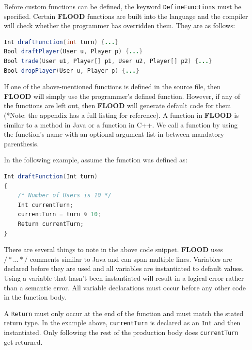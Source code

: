 \documentclass[12pt]{report}
\begin{document}
Before custom functions can be defined, the keyword \texttt{DefineFunctions} must be specified. Certain \textbf{FLOOD} functions are built into the language and the compiler will check whether the programmer has overridden them. They are as follows:

\begin{singlespace}
\begin{lstlisting}[language=Java,label=some-code,caption={Predefined FLOOD functions.}]
Int draftFunction(int turn) {...}
Bool draftPlayer(User u, Player p) {...}
Bool trade(User u1, Player[] p1, User u2, Player[] p2) {...}
Bool dropPlayer(User u, Player p) {...}
\end{lstlisting}
\end{singlespace}

If one of the above-mentioned functions is defined in the source file, then \textbf{FLOOD} will simply use the programmer's defined function. However, if any of the functions are left out, then \textbf{FLOOD} will generate default code for them (*Note: the appendix has a full listing for reference). A function in \textbf{FLOOD} is similar to a method in Java or a function in C++. We call a function by using the function's name with an optional argument list in between mandatory parenthesis.

In the following example, assume the function was defined as:

\begin{singlespace}
\begin{lstlisting}[language=Java,label=some-code,caption=Predefined FLOOD functions]
Int draftFunction(Int turn)
{
	/* Number of Users is 10 */
	Int currentTurn;
	currentTurn = turn % 10;
	Return currentTurn;
}
\end{lstlisting}
\end{singlespace}

There are several things to note in the above code snippet. \textbf{FLOOD} uses $/*\ldots*/$ comments similar to Java and can span multiple lines. Variables are declared before they are used and all variables are instantiated to default values. Using a variable that hasn't been instantiated will result in a logical error rather than a semantic error. All variable declarations must occur before any other code in the function body. 

A \texttt{Return} must only occur at the end of the function and must match the stated return type. In the example above, \texttt{currentTurn} is declared as an \texttt{Int} and then instantiated. Only following the rest of the production body does \texttt{currentTurn} get returned.
\end{document}
